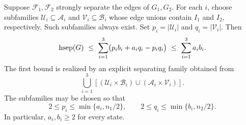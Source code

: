 \begin{lemma}\label{lem:splice}
Suppose $\mathcal F_1,\mathcal F_2$ strongly separate the edges of $G_1,G_2$.
For each $i$, choose subfamilies
$\mathcal U_i\subseteq\mathcal A_i$ and
$\mathcal V_i\subseteq\mathcal B_i$ whose edge unions contain $I_1$ and $I_2$,
respectively. Such subfamilies always exist. Set $p_i=|\mathcal U_i|$ and
$q_i=|\mathcal V_i|$. Then
\begin{equation}\label{eq:refined}
 \operatorname{hsep}(G)\ \le\ \sum_{i=1}^3
       \bigl(p_i b_i+a_i q_i-p_iq_i\bigr)
 \ \le\ \sum_{i=1}^3 a_i b_i.
\end{equation}
The first bound is realized by an explicit separating family obtained from
\begin{equation}\label{eq:pairs}
 \bigcup_{i=1}^3
 \left[(\mathcal U_i\times\mathcal B_i)
       \cup(\mathcal A_i\times\mathcal V_i)\right].
\end{equation}
The subfamilies may be chosen so that
\begin{equation}\label{eq:statecovers}
 2\le p_i\le\min\{a_i,n_1/2\},\qquad
 2\le q_i\le\min\{b_i,n_2/2\}.
\end{equation}
In particular, $a_i,b_i\ge2$ for every state.
\end{lemma}

